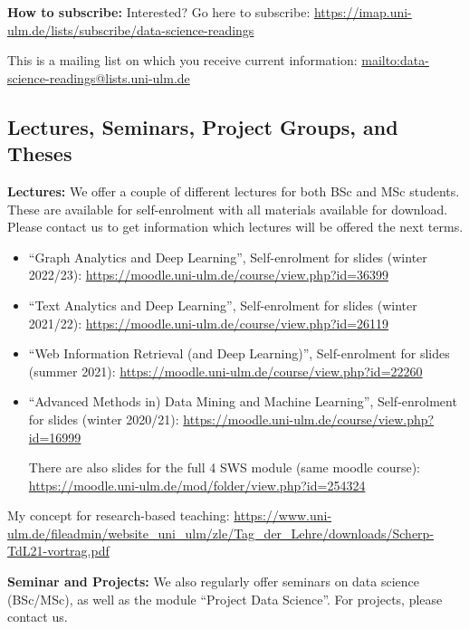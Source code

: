 \documentclass[sigconf, nonacm]{acmart}
\begin{document}
\textbf{How to subscribe:}
Interested? 
Go here to subscribe:
\url{https://imap.uni-ulm.de/lists/subscribe/data-science-readings}

This is a mailing list on which you receive current information: 
\url{mailto:data-science-readings@lists.uni-ulm.de}



\subsection{Lectures, Seminars, Project Groups, and Theses}

\textbf{Lectures:}
We offer a couple of different lectures for both BSc and MSc students.
These are available for self-enrolment with all materials available for download.
Please contact us to get information which lectures will be offered the next terms.

\begin{itemize}
\item ``Graph Analytics and Deep Learning'',
Self-enrolment for slides (winter 2022/23): 
\url{https://moodle.uni-ulm.de/course/view.php?id=36399}

\item ``Text Analytics and Deep Learning'',
Self-enrolment for slides (winter 2021/22): 
\url{https://moodle.uni-ulm.de/course/view.php?id=26119}

\item ``Web Information Retrieval (and Deep Learning)'', 
Self-enrolment for slides (summer 2021): 
\url{https://moodle.uni-ulm.de/course/view.php?id=22260}

\item ``Advanced Methods in) Data Mining and Machine Learning'', 
Self-enrolment for slides (winter 2020/21): 
\url{https://moodle.uni-ulm.de/course/view.php?id=16999}

There are also slides for the full 4 SWS module (same moodle course): 
\url{https://moodle.uni-ulm.de/mod/folder/view.php?id=254324}

\end{itemize}

My concept for research-based teaching:
\url{https://www.uni-ulm.de/fileadmin/website_uni_ulm/zle/Tag_der_Lehre/downloads/Scherp-TdL21-vortrag.pdf}

\textbf{Seminar and Projects:}
We also regularly offer seminars on data science (BSc/MSc), as well as the module ``Project Data Science''.
For projects, please contact us.
\end{document}
